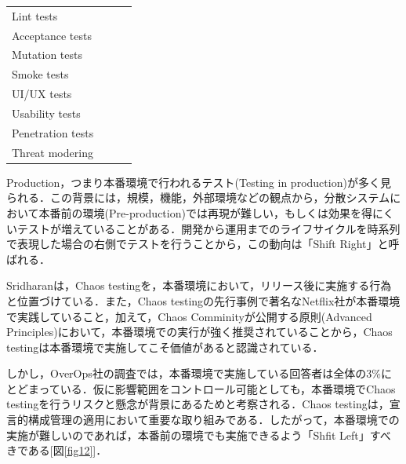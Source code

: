 \documentclass[12pt,a4j]{ujreport}
\begin{document}
\begin{footnotesize}
\begin{tabularx}{\linewidth}{
            >{\hsize=1.0\hsize}X|
            >{\hsize=1.0\hsize}X|
            >{\hsize=1.0\hsize}X|
            >{\hsize=1.0\hsize}X
        }
        Lint tests           &                                            &                    &                      \\
        Acceptance tests     &                                            &                    &                      \\
        Mutation tests       &                                            &                    &                      \\
        Smoke tests          &                                            &                    &                      \\
        UI/UX tests          &                                            &                    &                      \\
        Usability tests      &                                            &                    &                      \\
        Penetration tests    &                                            &                    &                      \\
        Threat modering      &                                            &                    &                      \\ \hline
    \end{tabularx}
\end{footnotesize}

Production，つまり本番環境で行われるテスト(Testing in production)が多く見られる．この背景には，規模，機能，外部環境などの観点から，分散システムにおいて本番前の環境(Pre-production)では再現が難しい，もしくは効果を得にくいテストが増えていることがある．開発から運用までのライフサイクルを時系列で表現した場合の右側でテストを行うことから，この動向は「Shift Right」と呼ばれる\cite{ref43}．

Sridharanは，Chaos testingを，本番環境において，リリース後に実施する行為と位置づけている．また，Chaos testingの先行事例で著名なNetflix社が本番環境で実践していること\cite{ref44}，加えて，Chaos Comminityが公開する原則(Advanced Principles)において，本番環境での実行が強く推奨されていること\cite{ref37}から，Chaos testingは本番環境で実施してこそ価値があると認識されている．

しかし，OverOps社の調査では，本番環境で実施している回答者は全体の3\%にとどまっている\cite{ref45}．仮に影響範囲をコントロール可能としても，本番環境でChaos testingを行うリスクと懸念が背景にあるためと考察される．Chaos testingは，宣言的構成管理の適用において重要な取り組みである．したがって，本番環境での実施が難しいのであれば，本番前の環境でも実施できるよう「Shfit Left」すべきである[図\ref{fig12}]．
\end{document}

